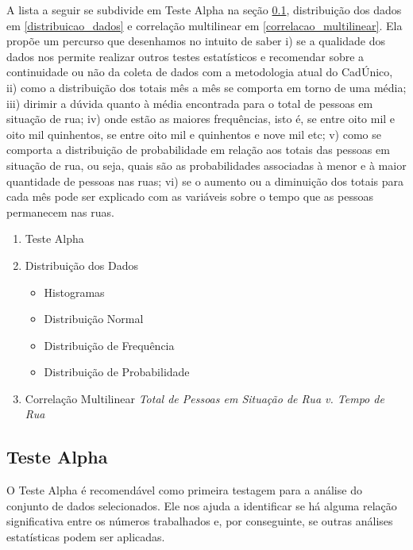 \documentclass[12pt]{article}
\begin{document}
A lista a seguir se subdivide em Teste Alpha na seção \ref{teste_alpha}, distribuição dos dados em \ref{distribuicao_dados} e correlação multilinear em \ref{correlacao_multilinear}. Ela propõe um percurso que desenhamos no intuito de saber i) se a qualidade dos dados nos permite realizar outros testes estatísticos e recomendar sobre a continuidade ou não da coleta de dados com a metodologia atual do CadÚnico, ii) como a distribuição dos totais mês a mês se comporta em torno de uma média; iii) dirimir a dúvida quanto à média encontrada para o total de pessoas em situação de rua; iv) onde estão as maiores frequências, isto é, se entre oito mil e oito mil quinhentos, se entre oito mil e quinhentos e nove mil etc; v) como se comporta a distribuição de probabilidade em relação aos totais das pessoas em situação de rua, ou seja, quais são as probabilidades associadas à menor e à maior quantidade de pessoas nas ruas; vi) se o aumento ou a diminuição dos totais para cada mês pode ser explicado com as variáveis sobre o tempo que as pessoas permanecem nas ruas.\\

\begin{enumerate}[3.2]
\item{Teste Alpha}
\item{Distribuição dos Dados}
\begin{itemize}[3.3.1]
\item{Histogramas}
\item{Distribuição Normal}
\item{Distribuição de Frequência}
\item{Distribuição de Probabilidade}
\end{itemize}
\item{Correlação Multilinear \textit{Total de Pessoas em Situação de Rua v. Tempo de Rua}}
\end{enumerate}
\vspace{0.3cm}

\subsection{Teste Alpha}
\label{teste_alpha}

O Teste Alpha é recomendável como primeira testagem para a análise do conjunto de dados selecionados. Ele nos ajuda a identificar se há alguma relação significativa entre os números trabalhados e, por conseguinte, se outras análises estatísticas podem ser aplicadas.\\ 
\end{document}
